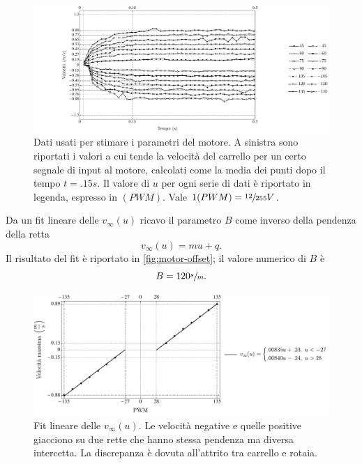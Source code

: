 \begin{figure}[H]
    \centering
    \includegraphics[width=\textwidth]{assets/motor-vmax-fit}
    \caption[Dati per stimare i parametri del motore]{Dati usati
    per stimare i parametri del motore. A sinistra sono riportati i valori
    a cui tende la velocità del carrello per un certo segnale di input al
    motore, calcolati come la media dei punti dopo il tempo $t = .15s$.
    Il valore di $u$ per ogni serie di dati è riportato in legenda, espresso
    in $(PWM)$. Vale $1 (PWM) = \sfrac {12}{255}V$.
    }
    \label{fig:motor-vmax-fit}
\end{figure}

Da un fit lineare delle $v_\infty(u)$ ricavo il parametro $B$ come inverso
della pendenza della retta
\begin{equation}
    v_\infty(u) = m u + q.
    \label{eq:vinfmuq}
\end{equation}
Il risultato del fit è riportato in \autoref{fig:motor-offset}; il valore
numerico di $B$ è
\begin{equation*}
    B = 120 \sfrac s m.
\end{equation*}

\begin{figure}[H]
    \centering
    \includegraphics[width=\textwidth]{assets/motor-offset}
    \caption[Fit lineare delle velocità asintotiche del carrello]{
    Fit lineare delle $v_{\infty}(u)$. Le velocità negative e quelle positive
    giacciono su due rette che hanno stessa pendenza ma diversa intercetta.
    La discrepanza è dovuta all'attrito tra carrello e rotaia.
    }
    \label{fig:motor-offset}
\end{figure}

